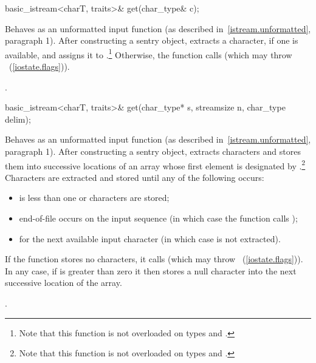 %
\begin{itemdecl}
basic_istream<charT, traits>& get(char_type& c);
\end{itemdecl}

\begin{itemdescr}
\pnum
\effects
Behaves as an unformatted input function
(as described in~\ref{istream.unformatted}, paragraph 1).
After constructing a sentry object, extracts
a character, if one is available, and assigns it to .\footnote{Note
that this function is not overloaded on types
and
.}
Otherwise, the function calls
(which may throw
~(\ref{iostate.flags})).

\pnum
\returns
{}.
\end{itemdescr}

%
\begin{itemdecl}
basic_istream<charT, traits>& get(char_type* s, streamsize n,
                                  char_type delim);
\end{itemdecl}

\begin{itemdescr}
\pnum
\effects
Behaves as an unformatted input function
(as described in~\ref{istream.unformatted}, paragraph 1).
After constructing a sentry object, extracts
characters and stores them
into successive locations of an array whose first element is designated by
.\footnote{Note that this function is not overloaded on types
and
.}
Characters are extracted and stored until any of the following occurs:
\begin{itemize}
\item
{} is less than one or 
characters are stored;
\item
end-of-file occurs on the input sequence
(in which case the function calls
);
\item
{}
for the next available input
character 
(in which case  is not extracted).
\end{itemize}

\pnum
If the function stores no characters, it calls
(which may throw
~(\ref{iostate.flags})).
In any case, if  is greater than zero it then stores a null character
into the next successive location of the array.

\pnum
\returns
{}.
\end{itemdescr}


